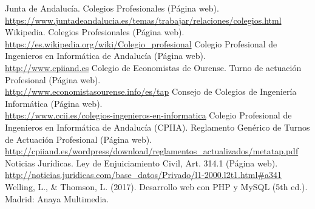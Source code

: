 
\begin{thebibliography}{0}
   Junta de Andalucía. Colegios Profesionales (Página web).
  	\\ \url{https://www.juntadeandalucia.es/temas/trabajar/relaciones/colegios.html}
   Wikipedia. Colegios Profesionales (Página web). 
  	\\ \url{https://es.wikipedia.org/wiki/Colegio_profesional}
   Colegio Profesional de Ingenieros en Informática de Andalucía (Página web).
  	\\ \url{http://www.cpiiand.es}
   Colegio de Economistas de Ourense. Turno de actuación Profesional (Página web).
  	\\ \url{http://www.economistasourense.info/es/tap}
   Consejo de Colegios de Ingeniería Informática (Página web).
  	\\ \url{https://www.ccii.es/colegios-ingenieros-en-informatica}
   Colegio Profesional de Ingenieros en Informática de Andalucía (CPIIA). Reglamento Genérico de Turnos de Actuación Profesional (Página web).
  	\\ \url{http://cpiiand.es/wordpress/download/reglamentos_actualizados/metatap.pdf}
   Noticias Jurídicas. Ley de Enjuiciamiento Civil, Art. 314.1 (Página web).
  	\\ \url{http://noticias.juridicas.com/base_datos/Privado/l1-2000.l2t1.html#a341}
   Welling, L., \& Thomson, L. (2017). Desarrollo web con PHP y MySQL (5th ed.). Madrid: Anaya Multimedia.
\end{thebibliography}

